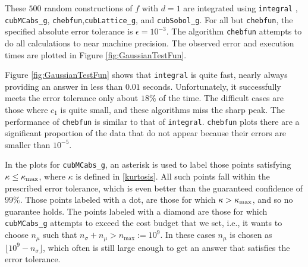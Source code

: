 \documentclass{iitthesis}
\theoremstyle{definition}
\begin{document}
These $500$ random constructions of $f$ with $d=1$ are integrated using {\tt integral} \cite{Shampone08},  {\tt cubMCabs\_g}, {\tt chebfun}\cite{Chebfun14},{\tt cubLattice\_g}\cite{JimHic16a}, and {\tt cubSobol\_g}\cite{HicJim16a}.
%
For all but {\tt chebfun}, the specified absolute error tolerance is $\epsilon=10^{-3}$. The algorithm {\tt chebfun} attempts to do all calculations to near machine precision.  The observed error and execution times are plotted in Figure \ref{fig:GaussianTestFun}.  
%

Figure \ref{fig:GaussianTestFun} shows that {\tt integral} is quite fast, nearly always providing an answer in less than $0.01$ seconds.  Unfortunately, it successfully meets the error tolerance only about $18\%$ of the time.  The difficult cases are those where $c_1$ is quite small, and these algorithms miss the sharp peak.  The performance of {\tt chebfun} is similar to that of {\tt integral}. {\tt chebfun} plots there are a significant proportion of the data that do not appear because their errors are smaller than $10^{-5}$.
%

In the plots for {\tt cubMCabs\_g}, an asterisk is used to label those points satisfying $\kappa \le \kappa_{\max}$, where $\kappa$ is defined in \eqref{kurtosis}. All such points fall within the prescribed error tolerance,
which is even better than the guaranteed confidence of $99\%$.  Those points labeled with a dot, are those for which $\kappa > \kappa_{\max}$, and so no guarantee holds. The points labeled with a diamond are those for which  {\tt cubMCabs\_g}  attempts to exceed the cost budget that we set, i.e., it wants to choose $n_\mu$ such that $n_{\sigma}+n_\mu > n_{\max}:=10^9$. In these cases $n_\mu$ is chosen as $\lfloor 10^9 - n_\sigma \rfloor$, which often is still large enough to get an answer that satisfies the error tolerance. 
\end{document}

